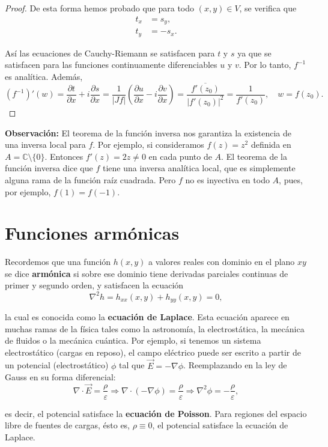 \begin{proof}
De esta forma hemos probado que para todo $(x,y) \in V$, se verifica que
\begin{align*}
    t_x &= s_y , \\
    t_y &= - s_x.
\end{align*}

Así las ecuaciones de Cauchy-Riemann se satisfacen para $t$ y $s$ ya que se satisfacen para las funciones continuamente diferenciables $u$ y $v$. Por lo tanto, $f^{-1}$ es analítica. Además, 
$$(f^{-1})'(w) = \frac{\partial t}{\partial x} + i \frac{\partial s}{\partial x} = \frac{1}{|Jf|} \left( \frac{\partial u}{\partial x} - i \frac{\partial v}{\partial x} \right) = \frac{\overline{f'(z_0)}}{|f'(z_0)|^2} = \frac{1}{f'(z_0)}, \quad w = f(z_0).$$
\end{proof}

\textbf{Observación:} El teorema de la función inversa nos garantiza la existencia de una inversa local para $f$. Por ejemplo, si consideramos $f(z) = z^2$ definida en $A = \mathbb{C} \setminus \{0\}$. Entonces $f'(z) = 2z \neq 0$ en cada punto de $A$. El teorema de la función inversa dice que $f$ tiene una inversa analítica local, que es simplemente alguna rama de la función raíz cuadrada. Pero $f$ no es inyectiva en todo $A$, pues, por ejemplo, $f(1) = f(-1)$.

\section{Funciones armónicas}

Recordemos que una función $h(x,y)$ a valores reales con dominio en el plano $xy$ se dice \textbf{armónica} si sobre ese dominio tiene derivadas parciales continuas de primer y segundo orden, y satisfacen la ecuación
$$\nabla^2 h = h_{xx}(x,y) + h_{yy} (x,y) = 0,$$

la cual es conocida como la \textbf{ecuación de Laplace}. Esta ecuación aparece en muchas ramas de la física tales como la astronomía, la electrostática, la mecánica de fluidos o la mecánica cuántica. Por ejemplo, si tenemos un sistema electrostático (cargas en reposo), el campo eléctrico puede ser escrito a partir de un potencial (electrostático) $\phi$ tal que $\Vec{E} = -\nabla \phi$. Reemplazando en la ley de Gauss en su forma diferencial:
$$\nabla \cdot \Vec{E} = \frac{\rho}{\varepsilon} \Rightarrow \nabla \cdot ( - \nabla \phi) = \frac{\rho}{\varepsilon}  \Rightarrow \nabla^2 \phi = -\frac{\rho}{\varepsilon},$$

es decir, el potencial satisface la \textbf{ecuación de Poisson}. Para regiones del espacio libre de fuentes de cargas, ésto es, $\rho \equiv 0$, el potencial satisface la ecuación de Laplace.
\\
 
